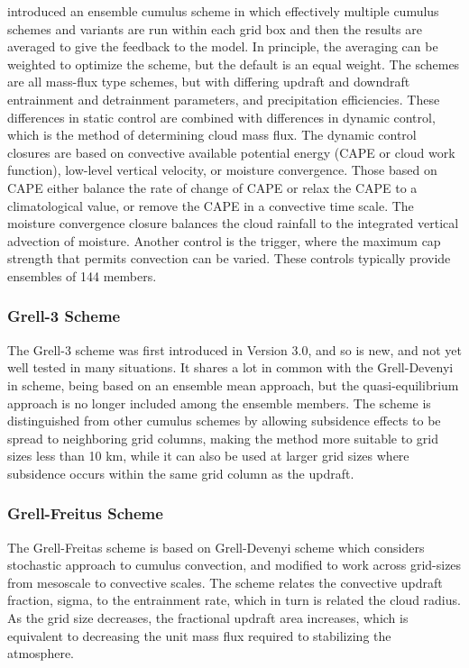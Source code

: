\citet{grell02} introduced an ensemble cumulus scheme 
in which effectively multiple cumulus schemes and variants are run 
within each grid box and then the results are averaged to give the 
feedback to the model. In principle, the averaging can be weighted 
to optimize the scheme, but the default is an equal weight. 
The schemes are all mass-flux type schemes, but with differing updraft 
and downdraft entrainment and detrainment parameters, and precipitation 
efficiencies. These differences in static control are combined with 
differences in dynamic control, which is the method of determining 
cloud mass flux. The dynamic control closures are based on convective 
available potential energy (CAPE or cloud work function), low-level 
vertical velocity, or moisture convergence. Those based on CAPE 
either balance the rate of change of CAPE or relax the CAPE to a 
climatological value, or remove the CAPE in a convective time scale. 
The moisture convergence closure balances the cloud rainfall to the 
integrated vertical advection of moisture. Another control
is the trigger, where the maximum cap strength that permits convection
can be varied. These controls typically provide ensembles of 144 members.

\subsubsection{Grell-3 Scheme}

The Grell-3 scheme was first introduced in Version 3.0, and so is
new, and not yet well tested in many situations. It shares a lot in
common with the Grell-Devenyi in scheme, being based on an ensemble mean
approach, but the quasi-equilibrium approach is no longer included
among the ensemble members. The scheme is distinguished from other
cumulus schemes by allowing subsidence effects to be spread to
neighboring grid columns, making the method more suitable to grid sizes
less than 10 km, while it can also be used at larger grid sizes where
subsidence occurs within the same grid column as the updraft. 

\subsubsection{Grell-Freitus Scheme}

The Grell-Freitas scheme \citep{grell14} is based on Grell-Devenyi 
scheme which considers stochastic approach to cumulus convection, and modified 
to work across grid-sizes from mesoscale to convective scales. The scheme 
relates the convective updraft fraction, sigma, to the entrainment rate, 
which in turn is related the cloud radius. As the grid size decreases, the 
fractional updraft area increases, which is equivalent to decreasing 
the unit mass flux required to stabilizing the atmosphere.

